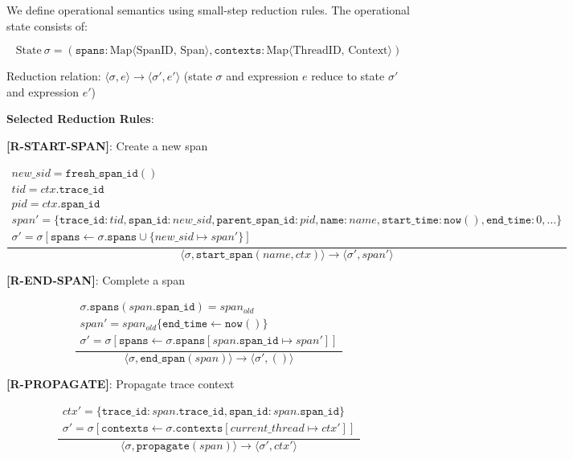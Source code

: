 We define operational semantics using small-step reduction rules. The operational state consists of:

\[
\text{State}\ \sigma = (\texttt{spans}: \text{Map⟨SpanID, Span⟩}, \texttt{contexts}: \text{Map⟨ThreadID, Context⟩})
\]

Reduction relation: $\langle\sigma, e\rangle \rightarrow \langle\sigma', e'\rangle$ (state $\sigma$ and expression $e$ reduce to state $\sigma'$ and expression $e'$)

\textbf{Selected Reduction Rules}:

\textbf{[R-START-SPAN]}: Create a new span

\[
\frac{\begin{array}{l}
      new\_sid = \texttt{fresh\_span\_id}() \\
      tid = ctx.\texttt{trace\_id} \\
      pid = ctx.\texttt{span\_id} \\
      span' = \{
        \texttt{trace\_id}: tid,
        \texttt{span\_id}: new\_sid,
        \texttt{parent\_span\_id}: pid,
        \texttt{name}: name,
        \texttt{start\_time}: \texttt{now}(),
        \texttt{end\_time}: 0,
        \ldots
      \} \\
      \sigma' = \sigma[\texttt{spans} \leftarrow \sigma.\texttt{spans} \cup \{new\_sid \mapsto span'\}]
      \end{array}}
     {\langle\sigma, \texttt{start\_span}(name, ctx)\rangle \rightarrow \langle\sigma', span'\rangle}
\]

\textbf{[R-END-SPAN]}: Complete a span

\[
\frac{\begin{array}{l}
      \sigma.\texttt{spans}(span.\texttt{span\_id}) = span_{old} \\
      span' = span_{old}\{\texttt{end\_time} \leftarrow \texttt{now}()\} \\
      \sigma' = \sigma[\texttt{spans} \leftarrow \sigma.\texttt{spans}[span.\texttt{span\_id} \mapsto span']]
      \end{array}}
     {\langle\sigma, \texttt{end\_span}(span)\rangle \rightarrow \langle\sigma', ()\rangle}
\]

\textbf{[R-PROPAGATE]}: Propagate trace context

\[
\frac{\begin{array}{l}
      ctx' = \{\texttt{trace\_id}: span.\texttt{trace\_id}, \texttt{span\_id}: span.\texttt{span\_id}\} \\
      \sigma' = \sigma[\texttt{contexts} \leftarrow \sigma.\texttt{contexts}[current\_thread \mapsto ctx']]
      \end{array}}
     {\langle\sigma, \texttt{propagate}(span)\rangle \rightarrow \langle\sigma', ctx'\rangle}
\]

